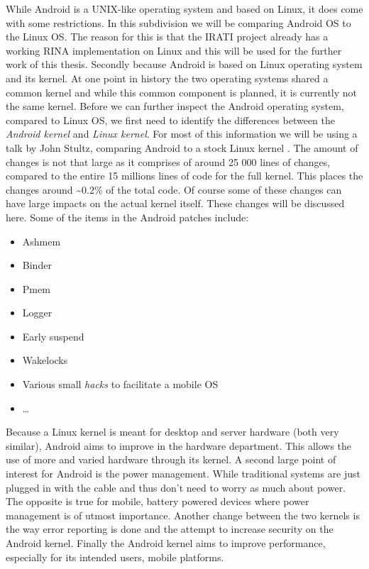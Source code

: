 While Android is a UNIX-like operating system and based on Linux, it does come with some restrictions. In this subdivision we will be comparing Android OS to the Linux OS. The reason for this is that the IRATI project already has a working RINA implementation on Linux and this will be used for the further work of this thesis. Secondly because Android is based on Linux operating system and its kernel. At one point in history the two operating systems shared a common kernel and while this common component is planned, it is currently not the same kernel. 
\npar
Before we can further inspect the Android operating system, compared to Linux OS, we first need to identify the differences between the \emph{Android kernel} and \emph{Linux kernel}. For most of this information we will be using a talk by John Stultz, comparing Android to a stock Linux kernel \citep{presentation:android_linux_kernel,website:android_linux_kernel}. The amount of changes is not that large as it comprises of around 25 000 lines of changes, compared to the entire 15 millions lines of code for the full kernel. This places the changes around \textasciitilde0.2\% of the total code. Of course some of these changes can have large impacts on the actual kernel itself. These changes will be discussed here. Some of the items in the Android patches include:
\begin{itemize}
	\item Ashmem
	\item Binder
	\item Pmem
	\item Logger
	\item Early suspend
	\item Wakelocks
	\item Various small \emph{hacks} to facilitate a mobile OS
	\item \ldots
\end{itemize}
Because a Linux kernel is meant for desktop and server hardware (both very similar), Android aims to improve in the hardware department. This allows the use of more and varied hardware through its kernel. A second large point of interest for Android is the power management. While traditional systems are just plugged in with the cable and thus don't need to worry as much about power. The opposite is true for mobile, battery powered devices where power management is of utmost importance. Another change between the two kernels is the way error reporting is done and the attempt to increase security on the Android kernel. Finally the Android kernel aims to improve performance, especially for its intended users, mobile platforms.

